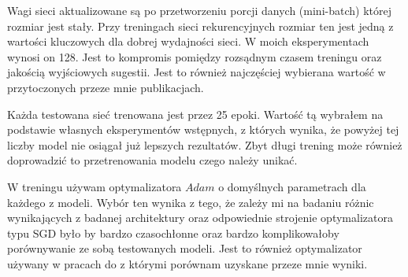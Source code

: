 Wagi sieci aktualizowane są po przetworzeniu porcji danych (mini-batch) której rozmiar jest stały. Przy treningach sieci rekurencyjnych rozmiar
ten jest jedną z wartości kluczowych dla dobrej wydajności sieci. W moich eksperymentach wynosi on 128. Jest to kompromis pomiędzy rozsądnym 
czasem treningu oraz jakością wyjściowych sugestii. Jest to również najczęściej wybierana wartość w przytoczonych przeze mnie publikacjach.

Każda testowana sieć trenowana jest przez 25 epoki. Wartość tą wybrałem na podstawie własnych eksperymentów wstępnych, z których wynika, że 
powyżej tej liczby model nie osiągał już lepszych rezultatów. Zbyt długi trening może również doprowadzić to przetrenowania modelu czego 
należy unikać. 

W treningu używam optymalizatora \begin{math}Adam\end{math} o domyślnych parametrach dla każdego z modeli.
Wybór ten wynika z tego, że zależy mi na badaniu różnic wynikających z badanej architektury oraz odpowiednie strojenie optymalizatora typu SGD
było by bardzo czasochłonne oraz bardzo komplikowałoby porównywanie ze sobą testowanych modeli. Jest to również optymalizator używany w pracach 
do z którymi porównam uzyskane przeze mnie wyniki.  

